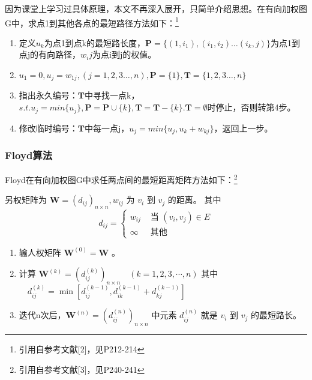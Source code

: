 \documentclass[12pt]{article}
\begin{document}
因为课堂上学习过具体原理，本文不再深入展开，只简单介绍思想。在有向加权图G中，求点1到其他各点的最短路径方法如下：\footnote{引用自参考文献[2]，见P212-214}
\begin{enumerate}
\item 定义$u_{k}$为点1到点k的最短路长度，$\mathbf{P}=\{(1,i_{1}),(i_{1},i_{2}) \dots(i_{k},j) \}$为点1到点j的有向路径，$w_{i}{j}$为点i到j的权值。
\item $u_{1}=0,u_{j}=w_{1j},(j=1,2,3\dots,n),\mathbf{P}=\{1\},\mathbf{T}=\{1,2,3\dots,n\}$
\item 指出永久编号：$\mathbf{T}$中寻找一点k，$s.t. u_{j}=min\{u_{j}\},\mathbf{P}=\mathbf{P}\cup\{k\},\mathbf{T}=\mathbf{T}-\{k\}.\mathbf{T}=\emptyset$时停止，否则转第4步。
\item 修改临时编号：$\mathbf{T}$中每一点j，$u_{j}=min\{u_{j},u_{k}+w_{kj}\}$，返回上一步。
\end{enumerate}
\subsubsection{Floyd算法}
Floyd在有向加权图G中求任两点间的最短距离矩阵方法如下：\footnote{引用自参考文献[3]，见P240-241}

另权矩阵为 $\mathbf{W}=\left(d_{i j}\right)_{n \times n}, w_{i j}$ 为 $v_i$ 到 $v_j$ 的距离。
其中
$$
d_{i j}= \begin{cases}w_{i j} & \text { 当 }\left(v_i, v_j\right) \in E \\ \infty & \text { 其他 }\end{cases}
$$
\begin{enumerate}
\item 输人权矩阵 $\mathbf{W}^{(0)}=\mathbf{W}$ 。
\item 计算 $\mathbf{W}^{(k)}=\left(d_{i j}^{(k)}\right)_{n \times n} \quad(k=1,2,3, \cdots, n)$
其中 $\quad d_{i j}^{(k)}=\min \left[d_{i j}^{(k-1)}, d_{i k}^{(k-1)}+d_{k j}^{(k-1)}\right]$
\item 迭代n次后，$\mathbf{W}^{(n)}=\left(d_{i j}^{(n)}\right)_{n \times n}$ 中元素 $d_{i j}^{(n)}$ 就是 $v_i$ 到 $v_j$ 的最短路长。
\end{enumerate}
\end{document}
